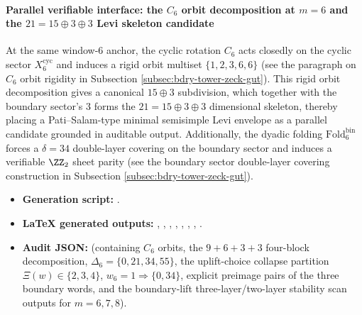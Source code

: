 \paragraph{Parallel verifiable interface: the \texorpdfstring{$C_6$}{C6} orbit decomposition at \(m=6\) and the \texorpdfstring{$21=15\oplus 3\oplus 3$}{21=15+3+3} Levi skeleton candidate}
At the same window-6 anchor, the cyclic rotation \(C_6\) acts closedly on the cyclic sector \(X_6^{\mathrm{cyc}}\) and induces a rigid orbit multiset \(\{1,2,3,6,6\}\) (see the paragraph on \texorpdfstring{$C_6$}{C6} orbit rigidity in Subsection \ref{subsec:bdry-tower-zeck-gut}).
This rigid orbit decomposition gives a canonical \(15\oplus 3\) subdivision, which together with the boundary sector's \(3\) forms the \(21=15\oplus 3\oplus 3\) dimensional skeleton,
thereby placing a Pati--Salam-type minimal semisimple Levi envelope as a parallel candidate grounded in auditable output.
Additionally, the dyadic folding \(\mathrm{Fold}^{\mathrm{bin}}_6\) forces a \(\delta=34\) double-layer covering on the boundary sector and induces a verifiable \(\ZZ_2\) sheet parity (see the boundary sector double-layer covering construction in Subsection \ref{subsec:bdry-tower-zeck-gut}).
\begin{itemize}
  \item \textbf{Generation script:} \texttt{}.
  \item \textbf{LaTeX generated outputs:} \texttt{},
  \texttt{},
  \texttt{},
  \texttt{},
  \texttt{},
  \texttt{},
  \texttt{},
  \texttt{}.
  \item \textbf{Audit JSON:} \texttt{} (containing \(C_6\) orbits, the \(9+6+3+3\) four-block decomposition, \(\Delta_6=\{0,21,34,55\}\), the uplift-choice collapse partition \(\Xi(w)\in\{2,3,4\}\), \(w_6=1\Rightarrow\{0,34\}\), explicit preimage pairs of the three boundary words, and the boundary-lift three-layer/two-layer stability scan outputs for \(m=6,7,8\)).
\end{itemize}

